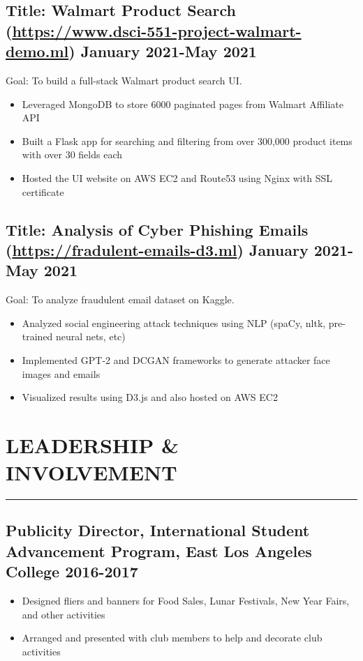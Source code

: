 \documentclass[12pt]{article}
\newcommand{\divider}{\vskip2pt{\color{black}\hrule}\vskip2pt}
\begin{document}
\subsection*{Title: Walmart Product Search (\href{https://www.dsci-551-project-walmart-demo.ml}{https://www.dsci-551-project-walmart-demo.ml}) \hfill {\normalfont January 2021-May 2021}}
\noindent
\href{https://github.com/Anthonyive/DSCI-551-Project.git}{} Goal: To build a full-stack Walmart product search UI.
\begin{itemize}
    \setlength\itemsep{-1pt}
    \item Leveraged MongoDB to store 6000 paginated pages from Walmart 
        Affiliate API
    \item Built a Flask app for searching and filtering from over 300,000 
        product items with over 30 fields each
    \item Hosted the UI website on AWS EC2 and Route53 using Nginx with SSL 
        certificate
\end{itemize}

\subsection*{Title: Analysis of Cyber Phishing Emails (\href{https://fradulent-emails-d3.ml}{https://fradulent-emails-d3.ml}) \hfill {\normalfont January 2021-May 2021}}
\noindent
\href{https://github.com/Anthonyive/DSCI-550-Assignments.git}{} Goal: To analyze fraudulent email dataset on Kaggle.
\begin{itemize}
    \setlength\itemsep{-1pt}
    \item Analyzed social engineering attack techniques using NLP (spaCy, 
        nltk, pre-trained neural nets, etc)
    \item Implemented GPT-2 and DCGAN frameworks to generate attacker 
        face images and emails
    \item Visualized results using D3.js and also hosted on AWS EC2
\end{itemize}

\section*{LEADERSHIP \& INVOLVEMENT}
\divider
\subsection*{Publicity Director{\normalfont, International Student Advancement Program, East Los Angeles College \hfill	2016-2017}}
\begin{itemize}
    \setlength\itemsep{-1pt}
    \item Designed fliers and banners for Food Sales, Lunar Festivals, 
        New Year Fairs, and other activities
    \item Arranged and presented with club members to help and decorate 
        club activities
\end{itemize}
\end{document}

